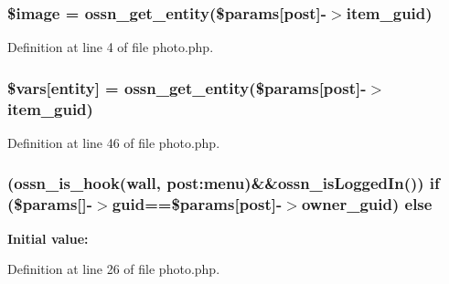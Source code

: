 \subsubsection[{\texorpdfstring{\$image}{$image}}]{\setlength{\rightskip}{0pt plus 5cm}\$image = {\bf ossn\+\_\+get\+\_\+entity}(\$params\mbox{[}\textquotesingle{}post\textquotesingle{}\mbox{]}-\/$>$item\+\_\+guid)}\hypertarget{profile_2photo_8php_aac6146b4cdec66c94263ddb55afd5946}{}\label{profile_2photo_8php_aac6146b4cdec66c94263ddb55afd5946}


Definition at line 4 of file photo.\+php.

\subsubsection[{\texorpdfstring{\$vars}{$vars}}]{\setlength{\rightskip}{0pt plus 5cm}\$vars\mbox{[}\textquotesingle{}entity\textquotesingle{}\mbox{]} = {\bf ossn\+\_\+get\+\_\+entity}(\$params\mbox{[}\textquotesingle{}post\textquotesingle{}\mbox{]}-\/$>$item\+\_\+guid)}\hypertarget{profile_2photo_8php_aa07d093940e8b3330058e9f2c4396426}{}\label{profile_2photo_8php_aa07d093940e8b3330058e9f2c4396426}


Definition at line 46 of file photo.\+php.

\subsubsection[{\texorpdfstring{else}{else}}]{ ({\bf ossn\+\_\+is\+\_\+hook}(\textquotesingle{}wall\textquotesingle{}, \textquotesingle{}post\+:menu\textquotesingle{})\&\&ossn\+\_\+is\+Logged\+In()) {\bf if} (\$params\mbox{[}\textquotesingle{}\mbox{]}-\/$>$guid==\$params\mbox{[}\textquotesingle{}post\textquotesingle{}\mbox{]}-\/$>${\bf owner\+\_\+guid}) else}\hypertarget{profile_2photo_8php_a455b1f9c77db61838a93b44445ad7413}{}\label{profile_2photo_8php_a455b1f9c77db61838a93b44445ad7413}
{\bfseries Initial value\+:}


Definition at line 26 of file photo.\+php.

